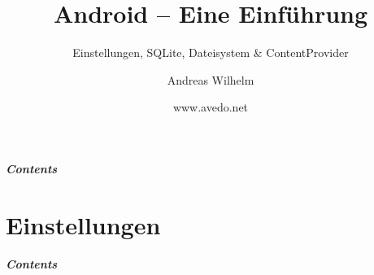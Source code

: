 \title{Android -- Eine Einführung}
\subtitle{Einstellungen, SQLite, Dateisystem \& ContentProvider}
\author[A. Wilhelm]{Andreas Wilhelm}
\titlegraphic{}
\date{www.avedo.net}

\begin{frame}[plain]
  \titlepage
\end{frame}

\section[Contents]{}
\begin{frame}
	\frametitle{Contents}
	\tableofcontents[onlyparts]
\end{frame}

\part{Einstellungen}
\frame{\partpage}
\begin{frame}
	\frametitle{Contents}
	\tableofcontents[]
\end{frame}

